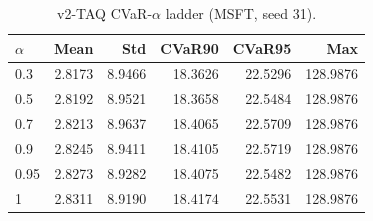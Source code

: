\begin{table}[H]
    \centering
    \caption{v2-TAQ CVaR-$\alpha$ ladder (MSFT, seed 31).}
    \label{tab:v2_taq_alpha}
    \begin{tabular}{@{}lrrrrr@{}}
        \toprule
        $\alpha$ & Mean & Std & CVaR90 & CVaR95 & Max \\
        \midrule
        0.3 & 2.8173 & 8.9466 & 18.3626 & 22.5296 & 128.9876 \\
        0.5 & 2.8192 & 8.9521 & 18.3658 & 22.5484 & 128.9876 \\
        0.7 & 2.8213 & 8.9637 & 18.4065 & 22.5709 & 128.9876 \\
        0.9 & 2.8245 & 8.9411 & 18.4105 & 22.5719 & 128.9876 \\
        0.95 & 2.8273 & 8.9282 & 18.4075 & 22.5482 & 128.9876 \\
        1 & 2.8311 & 8.9190 & 18.4174 & 22.5531 & 128.9876 \\
        \bottomrule
    \end{tabular}
\end{table}
